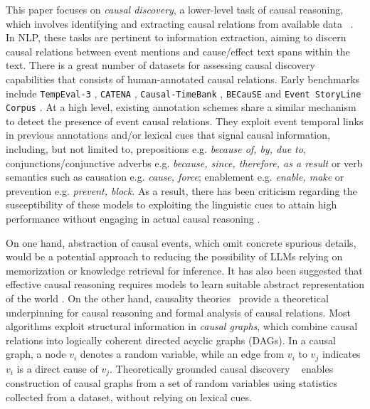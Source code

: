 This paper focuses on \textit{causal discovery}, a lower-level task of causal reasoning, which involves identifying and extracting causal relations from available data ~\citep{yang2022survey,tan2022eventPear}. In NLP, these tasks are pertinent to information extraction, aiming to discern causal relations between event mentions and cause/effect text spans within the text. There is a great number of datasets for assessing causal discovery capabilities that consists of human-annotated causal relations.  Early benchmarks include \texttt{TempEval-3} \cite{mirza2014annotating}, \texttt{CATENA} \cite{mirza2016catena}, \texttt{Causal-TimeBank} \cite{mirza-tonelli-2014-analysis}, \texttt{BECauSE} \cite{dunietz2015annotating, dunietz2017because} and \texttt{Event StoryLine Corpus} \cite{caselli2017event}. At a high level, existing annotation schemes share a similar mechanism to detect the presence of event causal relations. They exploit event temporal links in previous annotations \cite{pustejovsky2003timebank, pustejovsky2006timebank} and/or lexical cues that signal causal information, including, but not limited to, prepositions e.g. \textit{because of, by, due to}, conjunctions/conjunctive adverbs e.g. \textit{because, since, therefore, as a result} or verb semantics \cite{wolff2003models, mirza-tonelli-2014-analysis} such as causation e.g. \textit{cause, force}; enablement e.g. \textit{enable, make} or prevention e.g. \textit{prevent, block}. As a result, there has been criticism regarding the susceptibility of these models to exploiting the linguistic cues to attain high performance without engaging in actual causal reasoning
\citep{yang2022survey,li2022counterfactual}.



On one hand, abstraction of causal events, which omit concrete spurious details, would be a potential approach to reducing the possibility of LLMs relying on memorization or knowledge retrieval for inference. It has also been suggested that effective causal reasoning requires models to learn suitable abstract representation of the world \citep{girju2003automatic}. On the other hand, causality theories~\citep{pearl2009causality} provide a theoretical underpinning for causal reasoning and formal analysis of causal relations. Most algorithms exploit structural information in \textit{causal graphs}, which combine causal relations into logically coherent directed acyclic graphs (DAGs). In a causal graph, a node $v_i$ denotes a random variable, while an edge from $v_i$ to $v_j$ indicates $v_i$ is a direct cause of $v_j$. Theoretically grounded causal discovery ~\cite{vowels2022d} enables construction of causal graphs from a set of random variables using statistics collected from a dataset, without relying on lexical cues. 

